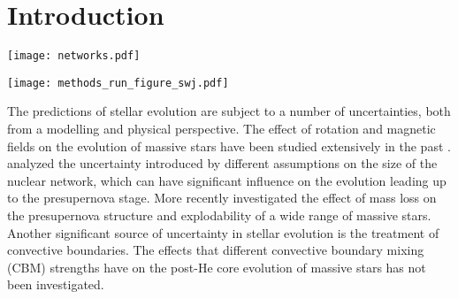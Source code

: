 \documentclass[useAMS,usenatbib]{mn2e}
\newcommand{\mesa}{\texttt{MESA}}
\newcommand{\template}{\textsc{\texttt{template}}}
\newcommand{\C}{\textsc{\texttt{C}}}
\newcommand{\ONe}{\textsc{\texttt{ONe}}}
\newcommand{\Si}{\textsc{\texttt{Si}}}
\begin{document}
\section{Introduction} \label{sec:intro}

\begin{figure*}
	\texttt{[image: networks.pdf]}
	\caption{
		The nuclear reaction network used in the \mesa~
		simulations. The different marker styles represent the evolutionary 
		stage where the element was included in the reaction network.
	}
	\label{fig:network} %
\end{figure*}

\begin{figure*}
	\texttt{[image: methods\_run\_figure\_swj.pdf]}%
	\caption{
		The regions of the \mesa~simulation under investigation. The
		Kippenhahn diagram is taken from the \template\ simulation.
		Grey areas represent regions that are convectively unstable and
		the blue contours are regions of positive energy generation
		where $\epsilon_\nu$ is the specific energy loss rate due to
		neutrino production. The x-axis is given in log of the time
		until the star collapses, where $\tau$ is the stars age at collapse. 
		The solid blue line marks the H free core ($X_{\mathrm{H}} < 10^{-2}$), 
		the dashed green line is the CO core boundary 
		($X_{\ensuremath{\mathrm{^{4}He}}} < 10^{-2}$),
		the dash-dotted red line is the ONe core
		($X_{\ensuremath{\mathrm{^{12}C}}} < 10^{-2}$), the dash-dotted
		light blue line is the Si core
		($X_{\ensuremath{\mathrm{^{16}O}}} < 10^{-2}$) and the
		dash-dotted magenta line is the Fe core
		($X_{\ensuremath{\mathrm{^{28}Si}}} < 10^{-2}$). The orange
		lines mark the region of interest for this study. The
		vertical orange lines mark the beginning of core burning
		stages which are the points where the
		CBM is increased for each of the respective run sets (\C, \ONe,
		\Si).
	}
	\label{fig:2_kip_runs} %
\end{figure*}

The predictions of stellar evolution are subject to a number of uncertainties, both from a modelling and physical perspective. The effect of rotation and magnetic fields on the evolution of massive stars have been studied extensively in the past \citep[e.g.][]{Heger:2005bi}. \cite{Farmer2016} analyzed the uncertainty introduced by different assumptions on the size of the nuclear network, which can have significant influence on the evolution leading up to the presupernova stage. More recently \citet{Sukhbold2017} investigated the effect of mass loss on the presupernova structure and explodability of a wide range of massive stars. Another significant source of uncertainty in stellar evolution is the treatment of convective boundaries. The effects that different convective boundary mixing (CBM) strengths have on the post-He core evolution of massive stars has not been investigated.
 
\end{document}

